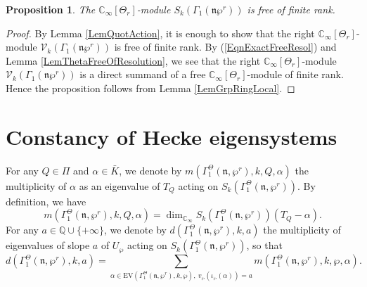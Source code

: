 \documentclass[11pt]{amsart}
\theoremstyle{plain}
\newtheorem{prop}[thm]{Proposition}
\theoremstyle{definition}
\newcommand{\EV}{\mathrm{EV}}
\newcommand{\cV}{\mathcal{V}}
\newcommand{\bQ}{\mathbb{Q}}
\newcommand{\frn}{\mathfrak{n}}
\newcommand{\Cinf}{\mathbb{C}_{\infty}}
\begin{document}
\begin{prop}\label{PropFree}
	The $\Cinf[\Theta_r]$-module $S_k(\Gamma_1(\frn\wp^r))$ is free of finite rank.
\end{prop}
\begin{proof}
By Lemma \ref{LemQuotAction}, it is enough to show that the right $\Cinf[\Theta_r]$-module $\cV_k(\Gamma_1(\frn\wp^r))$ is free of finite rank.
By (\ref{EqnExactFreeResol}) and Lemma \ref{LemThetaFreeOfResolution}, 
we see that the right $\Cinf[\Theta_r]$-module $\cV_k(\Gamma_1(\frn\wp^r))$ is a direct summand of a free $\Cinf[\Theta_r]$-module of finite rank. 
Hence the proposition
follows from Lemma \ref{LemGrpRingLocal}.
\end{proof}









\section{Constancy of Hecke eigensystems}\label{SecConst}



For any $Q\in \Pi$ and $\alpha\in \bar{K}$, we denote by $m(\Gamma_1^\Theta(\frn,\wp^r),k,Q,\alpha)$ the multiplicity of $\alpha$ as an eigenvalue of $T_Q$ acting on
$S_k(\Gamma_1^\Theta(\frn,\wp^r))$. By definition, we have
\[
m(\Gamma_1^\Theta(\frn,\wp^r),k,Q,\alpha)=\dim_{\Cinf}S_k(\Gamma_1^\Theta(\frn,\wp^r))(T_Q-\alpha).
\]
For any $a\in \bQ\cup\{+\infty\}$, we denote by $d(\Gamma_1^\Theta(\frn,\wp^r),k,a)$ the multiplicity of eigenvalues of slope $a$ of $U_\wp$ acting on
$S_k(\Gamma_1^\Theta(\frn,\wp^r))$, so that
\begin{equation}\label{EqnSlopeMulti}
d(\Gamma_1^\Theta(\frn,\wp^r),k,a)=\sum_{\alpha\in \EV(\Gamma_1^\Theta(\frn,\wp^r),k,\wp),\ v_\wp(\iota_\wp(\alpha))=a} m(\Gamma_1^\Theta(\frn,\wp^r),k,\wp,
\alpha).
\end{equation}
\end{document}
